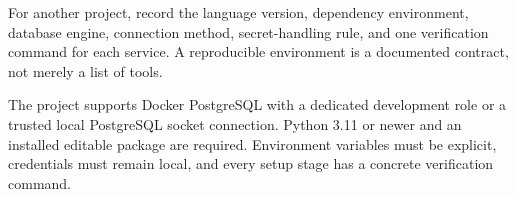 \transferheading
For another project, record the language version, dependency environment,
database engine, connection method, secret-handling rule, and one verification
command for each service. A reproducible environment is a documented contract,
not merely a list of tools.

\begin{summarybox}
The project supports Docker PostgreSQL with a dedicated development role or a
trusted local PostgreSQL socket connection. Python 3.11 or newer and an
installed editable package are required. Environment variables must be
explicit, credentials must remain local, and every setup stage has a concrete
verification command.
\end{summarybox}
